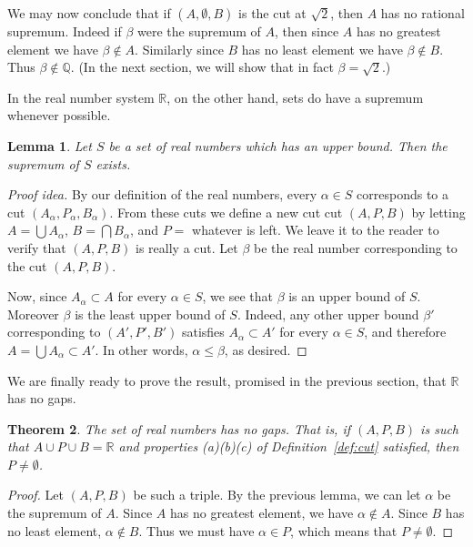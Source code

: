 \documentclass[11pt,oneside]{amsbook}
\newcommand{\Q}{\mathbb Q}
\newcommand{\R}{\mathbb R}
\theoremstyle{definition}
\theoremstyle{plain}
\newtheorem{theorem}{Theorem}[section]
\newtheorem{lemma}[theorem]{Lemma}
\theoremstyle{definition}
\theoremstyle{remark}
\numberwithin{equation}{section}
\numberwithin{figure}{section}
\begin{document}
We may now conclude that if $(A,\emptyset,B)$ is the cut at $\sqrt2$, then $A$ has no rational supremum. Indeed if $\beta$ were the supremum of $A$, then since $A$ has no greatest element we have $\beta\notin A$. Similarly since $B$ has no least element we have $\beta\notin B$. Thus $\beta\notin\Q$. (In the next section, we will show that in fact $\beta=\sqrt2$.)

In the real number system $\R$, on the other hand, sets do have a supremum whenever possible.

\begin{lemma}
  Let $S$ be a set of real numbers which has an upper bound. Then the supremum of $S$ exists.
\end{lemma}

\begin{proof}[Proof idea]
  By our definition of the real numbers, every $\alpha\in S$ corresponds to a cut $(A_\alpha,P_\alpha,B_\alpha)$. From these cuts we define a new cut cut $(A,P,B)$ by letting $A=\bigcup A_\alpha$, $B=\bigcap B_\alpha$, and $P=$ whatever is left. We leave it to the reader to verify that $(A,P,B)$ is really a cut. Let $\beta$ be the real number corresponding to the cut $(A,P,B)$.

  Now, since $A_\alpha\subset A$ for every $\alpha\in S$, we see that $\beta$ is an upper bound of $S$. Moreover $\beta$ is the least upper bound of $S$. Indeed, any other upper bound $\beta'$ corresponding to $(A',P',B')$ satisfies $A_\alpha\subset A'$ for every $\alpha\in S$, and therefore $A=\bigcup A_\alpha\subset A'$. In other words, $\alpha\leq\beta$, as desired.
\end{proof}

We are finally ready to prove the result, promised in the previous section, that $\R$ has no gaps.

\begin{theorem}
  The set of real numbers has no gaps. That is, if $(A,P,B)$ is such that $A\cup P\cup B=\R$ and properties (a)(b)(c) of Definition~\ref{def:cut} satisfied, then $P\neq\emptyset$.
\end{theorem}

\begin{proof}
  Let $(A,P,B)$ be such a triple. By the previous lemma, we can let $\alpha$ be the supremum of $A$. Since $A$ has no greatest element, we have $\alpha\notin A$. Since $B$ has no least element, $\alpha\notin B$. Thus we must have $\alpha\in P$, which means that $P\neq\emptyset$.
\end{proof}
\end{document}
